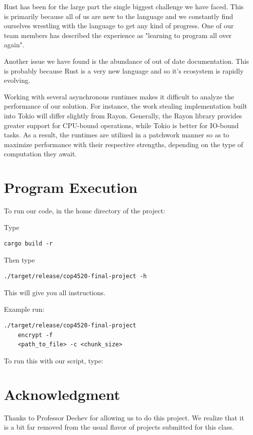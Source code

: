 \documentclass[conference]{IEEEtran}
\begin{document}
Rust has been for the large part the single biggest challenge we have faced.
This is primarily because all of us are new to the language and we constantly find ourselves
wrestling with the language to get any kind of progress.
One of our team members has described the experience as "learning to program all over again".

Another issue we have found is the abundance of out of date documentation.
This is probably because Rust is a very new language and so it's ecosystem is rapidly evolving.

Working with several asynchronous runtimes makes it difficult to analyze the performance of our solution. For instance,
the work stealing implementation built into Tokio will differ slightly from Rayon. Generally, the Rayon library provides
greater support for CPU-bound operations, while Tokio is better for IO-bound tasks. As a result, the runtimes are utilized in a patchwork manner so as to maximize performance with their
respective strengths, depending on the type of computation they await. 

\section{Program Execution}
To run our code, in the home directory of the project:

Type \begin{verbatim}cargo build -r\end{verbatim} 

Then type \begin{verbatim}./target/release/cop4520-final-project -h\end{verbatim}

This will give you all instructions.

Example run:
\begin{verbatim}./target/release/cop4520-final-project 
	encrypt -f 
	<path_to_file> -c <chunk_size>\end{verbatim}

To run this with our script, type:

\section*{Acknowledgment}

Thanks to Professor Dechev for allowing us to do this project.
We realize that it is a bit far removed from the usual flavor
of projects submitted for this class.
\end{document}
